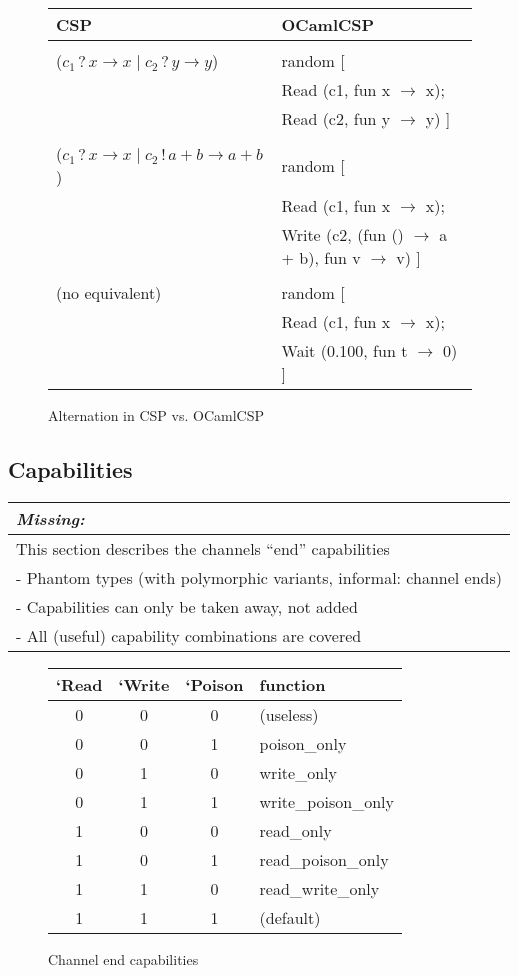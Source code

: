 \documentclass[11pt,oneside,a4paper]{article}
\newcommand{\missing}[1]{
\begin{tabular}{|p{11cm}|}
\hline
\emph{Missing:} \\
\hline
#1
\hline
\end{tabular}
}
\begin{document}
\begin{figure}[h]
\centering
\begin{tabular}{l|l}
CSP & OCamlCSP \\
\hline
& \\
($c_1\,?\,x \to x \mid c_2\,?\,y \to y$) & random [ \\
& \quad Read (c1, fun x $\to$ x); \\
& \quad Read (c2, fun y $\to$ y) ] \\
& \\
($c_1\,?\,x \to x \mid c_2\,!\,a+b \to a+b$) & random [ \\
& \quad Read (c1, fun x $\to$ x); \\
& \quad Write (c2, (fun () $\to$ a + b), fun v $\to$ v) ] \\
& \\
(no equivalent) & random [ \\
& \quad Read (c1, fun x $\to$ x); \\
& \quad Wait (0.100, fun t $\to$ 0) ] \\
\end{tabular}
\caption{Alternation in CSP vs. OCamlCSP}
\label{channel-alternation}
\end{figure}

\subsection{Capabilities}
\missing{
This section describes the channels ``end'' capabilities \\
- Phantom types (with polymorphic variants, informal: channel ends) \\
- Capabilities can only be taken away, not added \\
- All (useful) capability combinations are covered \\
}

\begin{figure}[h]
\centering
\begin{tabular}{c|c|c|l}
`Read & `Write & `Poison & function \\
\hline
0 & 0 & 0 & (useless) \\
0 & 0 & 1 & poison\_only \\
0 & 1 & 0 & write\_only \\
0 & 1 & 1 & write\_poison\_only \\
1 & 0 & 0 & read\_only \\
1 & 0 & 1 & read\_poison\_only \\
1 & 1 & 0 & read\_write\_only \\
1 & 1 & 1 & (default) \\
\end{tabular}
\caption{Channel end capabilities}
\label{channel-capabilities}
\end{figure}
\end{document}
